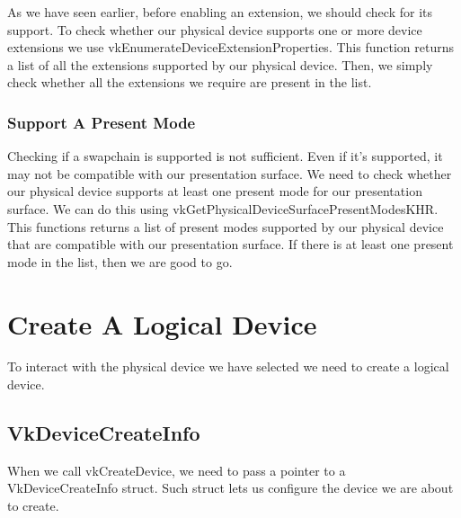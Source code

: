 \begin{minipage}{\linewidth}{\noindent}
    
\end{minipage}

As we have seen earlier, before enabling an extension, we should check for its
support.
To check whether our physical device supports one or more device extensions we use
vkEnumerateDeviceExtensionProperties.
This function returns a list of all the extensions supported by our physical device.
Then, we simply check whether all the extensions we require are present in the list.

\subsubsection{Support A Present Mode}

Checking if a swapchain is supported is not sufficient.
Even if it's supported, it may not be compatible with our presentation surface.
We need to check whether our physical device supports at least one present mode
for our presentation surface.
We can do this using vkGetPhysicalDeviceSurfacePresentModesKHR.
This functions returns a list of present modes supported by our physical device
that are compatible with our presentation surface.
If there is at least one present mode in the list, then we are good to go.

\section{Create A Logical Device}

To interact with the physical device we have selected we need to create
a logical device.

\begin{minipage}{\linewidth}{\noindent}
    
\end{minipage}

\subsection{VkDeviceCreateInfo}

When we call vkCreateDevice, we need to pass a pointer to a VkDeviceCreateInfo
struct.
Such struct lets us configure the device we are about to create.

